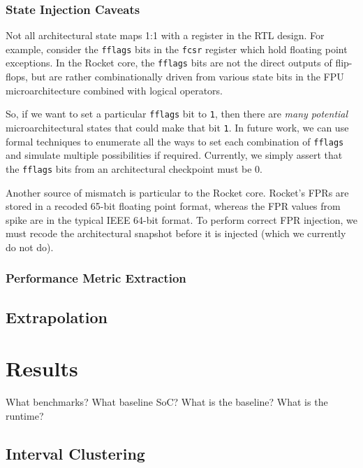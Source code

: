 \documentclass[sigplan,nonacm,10pt]{acmart}
\begin{document}
\subsubsection{State Injection Caveats}

Not all architectural state maps 1:1 with a register in the RTL design.
For example, consider the \texttt{fflags} bits in the \texttt{fcsr} register which hold floating point exceptions.
In the Rocket core, the \texttt{fflags} bits are not the direct outputs of flip-flops, but are rather combinationally driven from various state bits in the FPU microarchitecture combined with logical operators.

So, if we want to set a particular \texttt{fflags} bit to \texttt{1}, then there are \textit{many potential} microarchitectural states that could make that bit \texttt{1}.
In future work, we can use formal techniques to enumerate all the ways to set each combination of \texttt{fflags} and simulate multiple possibilities if required.
Currently, we simply assert that the \texttt{fflags} bits from an architectural checkpoint must be 0.

Another source of mismatch is particular to the Rocket core.
Rocket's FPRs are stored in a recoded 65-bit floating point format, whereas the FPR values from spike are in the typical IEEE 64-bit format.
To perform correct FPR injection, we must recode the architectural snapshot before it is injected (which we currently do not do).

\subsubsection{Performance Metric Extraction}



\subsection{Extrapolation}

\section{Results}

What benchmarks?
What baseline SoC?
What is the baseline?
What is the runtime?

\subsection{Interval Clustering}
\end{document}
